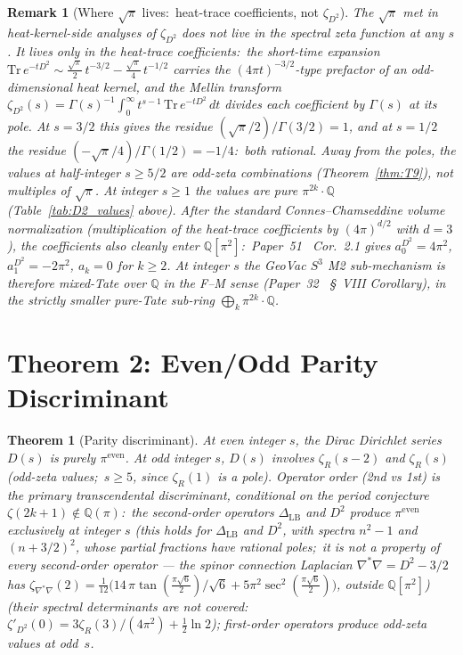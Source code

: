 \documentclass[11pt]{article}
\newtheorem{theorem}{Theorem}
\newtheorem{remark}{Remark}
\begin{document}
\begin{remark}[Where $\sqrt{\pi}$ lives:\ heat-trace coefficients,
not $\zeta_{D^2}$]
The $\sqrt{\pi}$ met in heat-kernel-side analyses of $\zeta_{D^2}$
does not live in the spectral zeta function at any $s$.  It lives only
in the heat-trace coefficients:\ the short-time expansion
$\mathrm{Tr}\,e^{-tD^2} \sim \tfrac{\sqrt{\pi}}{2}\,t^{-3/2}
- \tfrac{\sqrt{\pi}}{4}\,t^{-1/2}$ carries the $(4\pi t)^{-3/2}$-type
prefactor of an odd-dimensional heat kernel, and the Mellin transform
$\zeta_{D^2}(s) = \Gamma(s)^{-1}\int_0^\infty t^{s-1}\,
\mathrm{Tr}\,e^{-tD^2}\,dt$ divides each coefficient by $\Gamma(s)$ at
its pole.  At $s = 3/2$ this gives the residue
$(\sqrt{\pi}/2)/\Gamma(3/2) = 1$, and at $s = 1/2$ the residue
$(-\sqrt{\pi}/4)/\Gamma(1/2) = -1/4$:\ both rational.  Away from the
poles, the values at half-integer $s \ge 5/2$ are odd-zeta combinations
(Theorem~\ref{thm:T9}), not multiples of $\sqrt{\pi}$.  At integer
$s \ge 1$ the values are pure $\pi^{2k}\cdot\mathbb{Q}$
(Table~\ref{tab:D2_values} above). After
the standard Connes--Chamseddine volume normalization (multiplication
of the heat-trace coefficients by $(4\pi)^{d/2}$ with $d=3$), the
coefficients also cleanly enter $\mathbb{Q}[\pi^2]$:\ Paper~51~\cite{paper51} Cor.~2.1
gives $a_0^{D^2} = 4\pi^2$, $a_1^{D^2} = -2\pi^2$, $a_k = 0$ for
$k \ge 2$. At integer $s$ the GeoVac $S^3$ M2 sub-mechanism is therefore mixed-Tate
over $\mathbb{Q}$ in the F--M sense (Paper~32~\cite{paper32}
\S~VIII Corollary), in the strictly smaller pure-Tate sub-ring
$\bigoplus_k \pi^{2k}\cdot\mathbb{Q}$.
\end{remark}

\section{Theorem 2: Even/Odd Parity Discriminant}
\label{sec:parity}

\begin{theorem}[Parity discriminant]
\label{thm:parity}
At even integer $s$, the Dirac Dirichlet series $D(s)$ is purely
$\pi^{\mathrm{even}}$.  At odd integer $s$, $D(s)$ involves
$\zeta_R(s{-}2)$ and $\zeta_R(s)$ (odd-zeta values;\ $s \ge 5$, since
$\zeta_R(1)$ is a pole).  Operator order (2nd vs 1st) is the primary
transcendental discriminant, conditional on the period conjecture
$\zeta(2k{+}1) \notin \mathbb{Q}(\pi)$:\ the second-order operators
$\Delta_{\mathrm{LB}}$ and $D^2$ produce
$\pi^{\mathrm{even}}$ exclusively at integer $s$ (this holds for $\Delta_{\mathrm{LB}}$ and $D^2$, with spectra $n^2 - 1$
and $(n+3/2)^2$, whose partial fractions have rational poles;\ it is not a property of every second-order operator ---
the spinor connection Laplacian $\nabla^*\nabla = D^2 - 3/2$ has
$\zeta_{\nabla^*\nabla}(2) = \tfrac{1}{12}\bigl(14\,\pi\tan(\tfrac{\pi\sqrt6}{2})/\sqrt6
+ 5\pi^2\sec^2(\tfrac{\pi\sqrt6}{2})\bigr)$, outside $\mathbb{Q}[\pi^2]$) (their spectral
determinants are not covered:\ $\zeta'_{D^2}(0) = 3\zeta_R(3)/(4\pi^2) + \tfrac12\ln 2$); first-order
operators produce odd-zeta values at odd~$s$.
\end{theorem}
\end{document}
